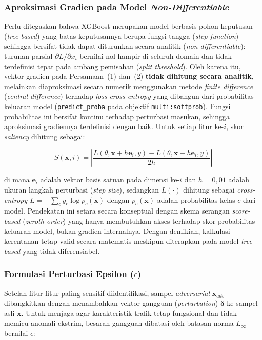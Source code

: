 \documentclass[11pt, a4paper]{article}
\begin{document}
\subsubsection{Aproksimasi Gradien pada Model \textit{Non-Differentiable}}
Perlu ditegaskan bahwa XGBoost merupakan model berbasis pohon keputusan (\textit{tree-based}) yang batas keputusannya berupa fungsi tangga (\textit{step function}) sehingga bersifat tidak dapat diturunkan secara analitik (\textit{non-differentiable}): turunan parsial $\partial L / \partial x_i$ bernilai nol hampir di seluruh domain dan tidak terdefinisi tepat pada ambang pemisahan (\textit{split threshold}). Oleh karena itu, vektor gradien pada Persamaan~(1) dan~(2) \textbf{tidak dihitung secara analitik}, melainkan diaproksimasi secara numerik menggunakan metode \textit{finite difference} (\textit{central difference}) terhadap \textit{loss} \textit{cross-entropy} yang dibangun dari probabilitas keluaran model (\texttt{predict\_proba} pada objektif \texttt{multi:softprob}). Fungsi probabilitas ini bersifat kontinu terhadap perturbasi masukan, sehingga aproksimasi gradiennya terdefinisi dengan baik. Untuk setiap fitur ke-$i$, skor \textit{saliency} dihitung sebagai:

\begin{equation}
S(\mathbf{x}, i) = \left| \frac{L(\theta, \mathbf{x} + h\mathbf{e}_i, y) - L(\theta, \mathbf{x} - h\mathbf{e}_i, y)}{2h} \right|
\end{equation}

di mana $\mathbf{e}_i$ adalah vektor basis satuan pada dimensi ke-$i$ dan $h = 0{,}01$ adalah ukuran langkah perturbasi (\textit{step size}), sedangkan $L(\cdot)$ dihitung sebagai \textit{cross-entropy} $L = -\sum_{c} y_c \log p_c(\mathbf{x})$ dengan $p_c(\mathbf{x})$ adalah probabilitas kelas $c$ dari model. Pendekatan ini setara secara konseptual dengan skema serangan \textit{score-based} (\textit{zeroth-order}) yang hanya membutuhkan akses terhadap skor probabilitas keluaran model, bukan gradien internalnya. Dengan demikian, kalkulasi kerentanan tetap valid secara matematis meskipun diterapkan pada model \textit{tree-based} yang tidak diferensiabel.

\subsubsection{Formulasi Perturbasi Epsilon ($\epsilon$)}
Setelah fitur-fitur paling sensitif diidentifikasi, sampel \textit{adversarial} $\mathbf{x}_{adv}$ dibangkitkan dengan menambahkan vektor gangguan (\textit{perturbation}) $\boldsymbol{\delta}$ ke sampel asli $\mathbf{x}$. Untuk menjaga agar karakteristik trafik tetap fungsional dan tidak memicu anomali ekstrim, besaran gangguan dibatasi oleh batasan norma $L_\infty$ bernilai $\epsilon$:
\end{document}
